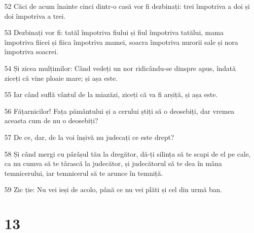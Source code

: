 \par 52 Căci de acum înainte cinci dintr-o casă vor fi dezbinați: trei împotriva a doi și doi împotriva a trei.
\par 53 Dezbinați vor fi: tatăl împotriva fiului și fiul împotriva tatălui, mama împotriva fiicei și fiica împotriva mamei, soacra împotriva nurorii sale și nora împotriva soacrei.
\par 54 Și zicea mulțimilor: Când vedeți un nor ridicându-se dinspre apus, îndată ziceți că vine ploaie mare; și așa este.
\par 55 Iar când suflă vântul de la miazăzi, ziceți că va fi arșiță, și așa este.
\par 56 Fățarnicilor! Fața pământului și a cerului știți să o deosebiți, dar vremea aceasta cum de nu o deosebiți?
\par 57 De ce, dar, de la voi înșivă nu judecați ce este drept?
\par 58 Și când mergi cu pârâșul tău la dregător, dă-ți silința să te scapi de el pe cale, ca nu cumva să te târască la judecător, și judecătorul să te dea în mâna temnicerului, iar temnicerul să te arunce în temniță.
\par 59 Zic ție: Nu vei ieși de acolo, până ce nu vei plăti și cel din urmă ban.

\chapter{13}

